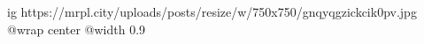  
 
 
 
 

\ifcmt
  ig https://mrpl.city/uploads/posts/resize/w/750x750/gnqyqgzickcik0pv.jpg
  @wrap center
  @width 0.9
\fi
